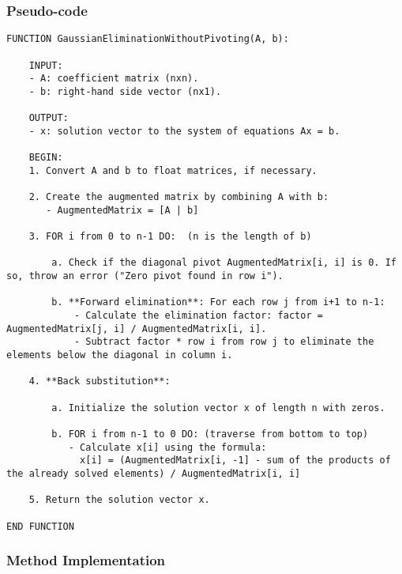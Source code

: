 \documentclass{article}
\begin{document}
        \subsubsection{Pseudo-code}
\begin{lstlisting}
FUNCTION GaussianEliminationWithoutPivoting(A, b):

    INPUT:
    - A: coefficient matrix (nxn).
    - b: right-hand side vector (nx1).

    OUTPUT:
    - x: solution vector to the system of equations Ax = b.

    BEGIN:
    1. Convert A and b to float matrices, if necessary.

    2. Create the augmented matrix by combining A with b:
       - AugmentedMatrix = [A | b]

    3. FOR i from 0 to n-1 DO:  (n is the length of b)

        a. Check if the diagonal pivot AugmentedMatrix[i, i] is 0. If so, throw an error ("Zero pivot found in row i").

        b. **Forward elimination**: For each row j from i+1 to n-1:
            - Calculate the elimination factor: factor = AugmentedMatrix[j, i] / AugmentedMatrix[i, i].
            - Subtract factor * row i from row j to eliminate the elements below the diagonal in column i.

    4. **Back substitution**:

        a. Initialize the solution vector x of length n with zeros.

        b. FOR i from n-1 to 0 DO: (traverse from bottom to top)
           - Calculate x[i] using the formula:
             x[i] = (AugmentedMatrix[i, -1] - sum of the products of the already solved elements) / AugmentedMatrix[i, i]

    5. Return the solution vector x.

END FUNCTION
\end{lstlisting}

        \subsubsection{Method Implementation}
\end{document}
